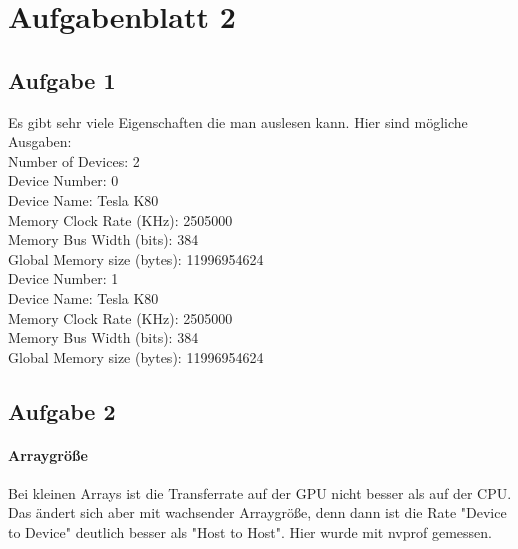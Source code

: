 \documentclass{article}
\begin{document}
\newpage

\section{Aufgabenblatt 2}

\subsection{Aufgabe 1}

Es gibt sehr viele Eigenschaften die man auslesen kann. Hier sind mögliche Ausgaben: \\

Number of Devices: 2\\
Device Number:                0\\
Device Name:                  Tesla K80\\
Memory Clock Rate (KHz):      2505000\\
Memory Bus Width (bits):      384\\
Global Memory size (bytes):   11996954624\\
Device Number:                1\\
Device Name:                  Tesla K80\\
Memory Clock Rate (KHz):      2505000\\
Memory Bus Width (bits):      384\\
Global Memory size (bytes):   11996954624\\

\subsection{Aufgabe 2}

\paragraph{Arraygröße} Bei kleinen Arrays ist die Transferrate auf der GPU nicht besser als auf der CPU. Das ändert sich aber mit wachsender Arraygröße, denn dann ist die Rate "Device to Device" deutlich besser als "Host to Host".
Hier wurde mit nvprof gemessen.
\end{document}
